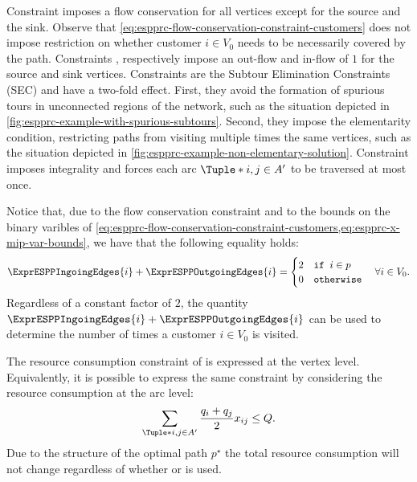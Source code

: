 Constraint  imposes a flow conservation for all vertices except for the source and the sink.
Observe that \cref{eq:espprc-flow-conservation-constraint-customers} does not impose
restriction on whether customer $i \in V_0$ needs to be necessarily covered by the path.
Constraints , 
respectively impose an out-flow and in-flow of $1$ for the source and sink vertices.
Constraints  are the Subtour Elimination Constraints (SEC) and
have a two-fold effect.
First, they avoid the formation of spurious tours in unconnected regions of the network, such
as the situation depicted in \cref{fig:espprc-example-with-spurious-subtours}.
Second, they impose the elementarity condition, restricting paths from visiting multiple times
the same vertices, such as the situation depicted in \cref{fig:espprc-example-non-elementary-solution}.
Constraint  imposes integrality
and forces each arc $\Tuple*{i, j} \in A^\prime$ to be traversed at most once.

Notice that, due to the flow conservation constraint and to the bounds on the binary varibles of
\cref{eq:espprc-flow-conservation-constraint-customers,eq:espprc-x-mip-var-bounds},
we have that the following equality holds:
\begin{equation}
	\ExprESPPIngoingEdges{i} + \ExprESPPOutgoingEdges{i} = \begin{cases}
		2 & \texttt{if } i \in p \\
		0 & \texttt{otherwise}
	\end{cases}
	\quad \forall i \in V_0.
\end{equation}
Regardless of a constant factor of $2$,
the quantity $\ExprESPPIngoingEdges{i} + \ExprESPPOutgoingEdges{i}$
can be used to determine the number of times a  customer $i \in V_0$ is visited.

The resource consumption constraint of  is
expressed at the vertex level.
Equivalently, it is possible to express the same constraint by considering the resource consumption
at the arc level:
\begin{equation}
	\label{eq:espprc-resource-upper-bound-constraint-arc-level}
	\sum_{\Tuple*{i, j} \in A^\prime} \frac{q_i + q_j}{2} x_{ij} \le Q.
\end{equation}
Due to the structure of the optimal path $p^\star$ the total resource consumption
will not change regardless of whether
or 
is used.

